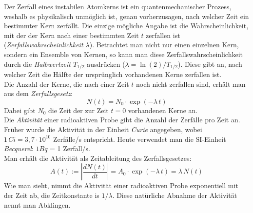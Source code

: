 Der Zerfall eines instabilen Atomkerns ist ein quantenmechanischer Prozess, weshalb es physikalisch unmöglich ist, genau vorherzusagen, nach welcher Zeit ein bestimmter Kern zerfällt. Die einzige mögliche Angabe ist die Wahrscheinlichkeit, mit der der Kern nach einer bestimmten Zeit $t$ zerfallen ist (\textit{Zerfallswahrscheinlichkeit $\lambda$}). Betrachtet man nicht nur einen einzelnen Kern, sondern ein Ensemble von Kernen, so kann man diese Zerfallswahrscheinlichkeit durch die \textit{Halbwertzeit $T_{1/2}$} ausdrücken ($\lambda = \ln(2)/T_{1/2}$). Diese gibt an, nach welcher Zeit die Hälfte der ursprünglich vorhandenen Kerne zerfallen ist.\\
Die Anzahl der Kerne, die nach einer Zeit $t$ noch nicht zerfallen sind, erhält man aus dem \textit{Zerfallsgesetz}:
\begin{equation} \label{eq:Zerfallsgesetz}
	N(t) = N_0\cdot \exp(-\lambda\, t)
\end{equation}
Dabei gibt $N_0$ die Zeit der zur Zeit $t=0$ vorhandenen Kerne an.\\

\noindent
Die \textit{Aktivität} einer radioaktiven Probe gibt die Anzahl der Zerfälle pro Zeit an. Früher wurde die Aktivität in der Einheit \textit{Curie} angegeben, wobei $1\,Ci = 3,7\cdot 10^{10}$ Zerfälle/s entspricht. Heute verwendet man die SI-Einheit \textit{Becquerel}: $1 Bq$ = 1 Zerfall/s.\\
Man erhält die Aktivität als Zeitableitung des Zerfallsgesetzes:
\begin{equation} \label{eq:Aktivitaet}
	A(t) := \left|\frac{dN(t)}{dt}\right| = A_0\cdot\exp(-\lambda\, t) = \lambda\, N(t)
\end{equation}
Wie man sieht, nimmt die Aktivität einer radioaktiven Probe exponentiell mit der Zeit ab, die Zeitkonstante is $1/\lambda$. Diese natürliche Abnahme der Aktivität nennt man Abklingen.

